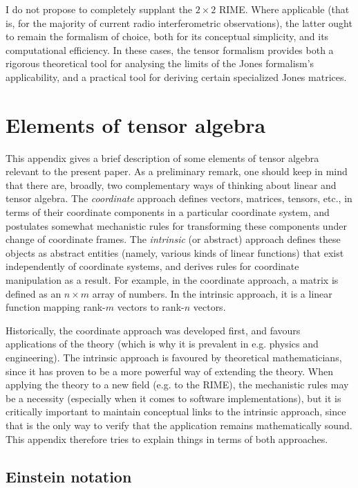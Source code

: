 \documentclass[]{aa}
\begin{document}
I do not propose to completely supplant the $2\times2$ RIME. Where applicable (that is, for the majority of current radio interferometric observations), the latter ought to remain the formalism of choice, both for its conceptual simplicity, and its computational efficiency. In these cases, the tensor formalism provides both a rigorous theoretical tool for analysing the limits of the Jones formalism's applicability, and a practical tool for deriving certain specialized Jones matrices.

\appendix

\section{Elements of tensor algebra}
\label{sec:tensor-theory}

This appendix gives a brief description of some elements of tensor algebra relevant to the present paper. As a preliminary remark, one should keep in mind that there are, broadly, two complementary ways of thinking about linear and tensor algebra. The \emph{coordinate} approach defines vectors, matrices, tensors, etc., in terms of their coordinate components in a particular coordinate system, and postulates somewhat mechanistic rules for transforming these components under change of coordinate frames. The \emph{intrinsic} (or abstract) approach defines these objects as abstract entities (namely, various kinds of linear functions) that exist independently of coordinate systems, and derives rules for coordinate manipulation as a result. For example, in the coordinate approach, a matrix is defined as an $n\times m$ array of numbers. In the intrinsic approach, it is a linear function mapping rank-$m$ vectors to rank-$n$ vectors.

Historically, the coordinate approach was developed first, and favours applications of the theory (which is why it is prevalent in e.g. physics and engineering). The intrinsic approach is favoured by theoretical mathematicians, since it has proven to be a more powerful way of extending the theory. When applying the theory to a new field (e.g. to the RIME), the mechanistic rules may be a necessity (especially when it comes to software implementations), but it is critically important to maintain conceptual links to the intrinsic approach, since that is the only way to verify that the application remains mathematically sound. This appendix therefore tries to explain things in terms of both approaches.

\subsection{Einstein notation}
\end{document}
